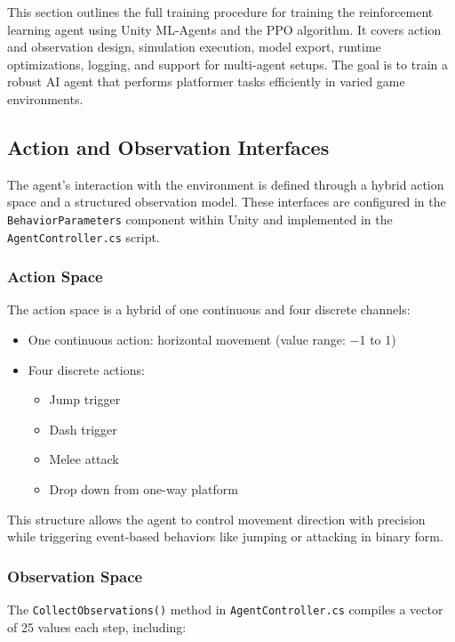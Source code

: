 \documentclass[12pt,oneside,openright,a4paper]{cpe-english-project}
\begin{document}
This section outlines the full training procedure for training the reinforcement learning agent using Unity ML-Agents and the PPO algorithm. It covers action and observation design, simulation execution, model export, runtime optimizations, logging, and support for multi-agent setups. The goal is to train a robust AI agent that performs platformer tasks efficiently in varied game environments.

\subsection{Action and Observation Interfaces}

The agent's interaction with the environment is defined through a hybrid action space and a structured observation model. These interfaces are configured in the \texttt{BehaviorParameters} component within Unity and implemented in the \texttt{AgentController.cs} script.

\subsubsection{Action Space}

The action space is a hybrid of one continuous and four discrete channels:

\begin{itemize}
\item One continuous action: horizontal movement (value range: −1 to 1)
\item Four discrete actions:
\begin{itemize}
\item Jump trigger
\item Dash trigger
\item Melee attack
\item Drop down from one-way platform
\end{itemize}
\end{itemize}

This structure allows the agent to control movement direction with precision while triggering event-based behaviors like jumping or attacking in binary form.

\subsubsection{Observation Space}

The \texttt{CollectObservations()} method in \texttt{AgentController.cs} compiles a vector of 25 values each step, including:
\end{document}
